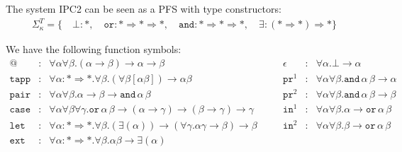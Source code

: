 \documentclass[a4paper,UKenglish,cleveref,autoref,numberwithinsect]{lipics-v2019}
\theoremstyle{definition}
\newcommand{\arrkind}{\Rightarrow}
\newcommand{\arrtype}{\rightarrow}
\newcommand{\proj}{\mathtt{pr}}
\begin{document}
The system IPC2 can be seen as a PFS with type constructors:
\[
\begin{array}{c}
\Sigma^T_\kappa = \{\quad
  \bot : *,\quad
  \mathtt{or} : * \arrkind * \arrkind *,\quad
  \mathtt{and} : * \arrkind * \arrkind *,\quad
  \exists : (* \arrkind *) \arrkind *
  \}
\end{array}
\]

We have the following function symbols:
\[
\begin{array}{rclcrcl}
@ & : & \forall \alpha \forall \beta . (\alpha \arrtype \beta) \arrtype \alpha \arrtype \beta &
\quad &
\epsilon & : & \forall \alpha . \bot \arrtype \alpha \\

\mathtt{tapp} & : & \forall \alpha : * \arrkind * . \forall \beta .
  (\forall \beta [\alpha \beta]) \arrtype \alpha \beta &
\quad &
\proj^1 & : & \forall \alpha \forall \beta . \mathtt{and}\, \alpha\, \beta \arrtype \alpha \\

\mathtt{pair} & : & \forall \alpha \forall \beta . \alpha \arrtype \beta \arrtype
  \mathtt{and}\, \alpha\, \beta &
\quad &
\proj^2 & : & \forall \alpha \forall \beta . \mathtt{and}\, \alpha\, \beta \arrtype \beta \\

\mathtt{case} & : & \forall \alpha \forall \beta \forall \gamma . \mathtt{or}\, \alpha\, \beta \arrtype
  (\alpha \arrtype \gamma) \arrtype (\beta \arrtype \gamma) \arrtype \gamma &
\quad &
\mathtt{in}^1 & : & \forall \alpha \forall \beta . \alpha \arrtype
  \mathtt{or}\, \alpha\, \beta \\

\mathtt{let} & : & \forall \alpha : * \arrkind * . \forall \beta .
  (\exists (\alpha)) \arrtype
  (\forall \gamma . \alpha \gamma \arrtype \beta) \arrtype \beta &
\quad &
\mathtt{in}^2 & : & \forall \alpha \forall \beta . \beta \arrtype
  \mathtt{or}\, \alpha\, \beta \\

\mathtt{ext} & : & \forall \alpha : * \arrkind * . \forall \beta . \alpha \beta \arrtype
  \exists (\alpha)
\end{array}
\]
\end{document}
